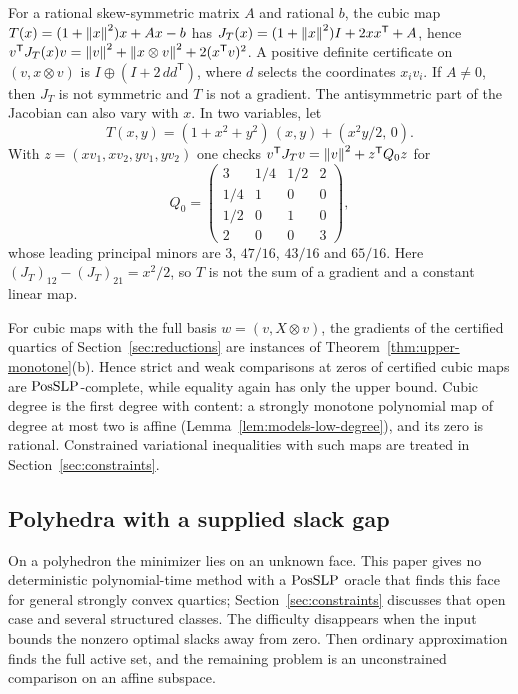 \begin{example}
\label{ex:upper-nongradient}
For a rational skew-symmetric matrix $A$ and rational $b$, the cubic map
$T(x)=(1+\left\lVert x\right\rVert^2)x+Ax-b$ has
$J_T(x)=(1+\left\lVert x\right\rVert^2)I+2xx^{\mathsf T}+A$, hence
$v^{\mathsf T}J_T(x)v=\left\lVert v\right\rVert^2+\left\lVert x\otimes v\right\rVert^2+2(x^{\mathsf T}v)^2$.
A positive definite certificate on $(v,x\otimes v)$ is $I\oplus(I+2\,dd^{\mathsf T})$,
where $d$ selects the coordinates $x_iv_i$. If $A\ne0$, then $J_T$ is not
symmetric and $T$ is not a gradient. The antisymmetric part of the Jacobian
can also vary with $x$. In two variables, let
\[
 T(x,y)=(1+x^2+y^2)\,(x,y)+(x^2y/2,\,0).
\]
With $z=(xv_1,xv_2,yv_1,yv_2)$ one checks
$v^{\mathsf T}J_T v=\left\lVert v\right\rVert^2+z^{\mathsf T}Q_0z$ for
\[
 Q_0=\begin{pmatrix}3&1/4&1/2&2\\1/4&1&0&0\\1/2&0&1&0\\2&0&0&3\end{pmatrix},
\]
whose leading principal minors are $3$, $47/16$, $43/16$ and $65/16$. Here
$(J_T)_{12}-(J_T)_{21}=x^2/2$, so $T$ is not the sum of a gradient and a
constant linear map.
\end{example}

For cubic maps with the full basis $w=(v,X\otimes v)$, the gradients of the
certified quartics of Section~\ref{sec:reductions} are instances of
Theorem~\ref{thm:upper-monotone}(b). Hence strict and weak comparisons at
zeros of certified cubic maps are $\mathrm{PosSLP}$-complete, while equality again
has only the upper bound. Cubic degree is the first degree with content: a
strongly monotone polynomial map of degree at most two is affine
(Lemma~\ref{lem:models-low-degree}), and its zero is rational. Constrained
variational inequalities with such maps are treated in
Section~\ref{sec:constraints}.

\subsection{Polyhedra with a supplied slack gap}
\label{sec:upper-slack}

On a polyhedron the minimizer lies on an unknown face. This paper gives no
deterministic polynomial-time method with a $\mathrm{PosSLP}$ oracle that finds this
face for general strongly convex quartics; Section~\ref{sec:constraints}
discusses that open case and several structured classes. The
difficulty disappears when the input bounds the nonzero optimal slacks away
from zero. Then ordinary approximation finds the full active set, and the
remaining problem is an unconstrained comparison on an affine subspace.

